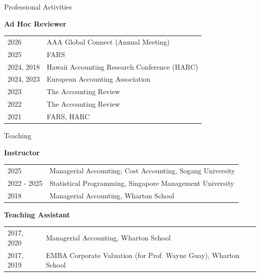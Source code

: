\documentclass{resume} %
\begin{document}
\begin{rSection}{Professional Activities}
\vspace{0.2cm}


{\bf Ad Hoc Reviewer} \medskip

\begin{tabular}{p{2cm}p{15.5cm}}
2026 & AAA Global Connect (Annual Meeting) \medskip \\
2025 & FARS \medskip \\
2024, 2018 &  Hawaii Accounting Research Conference (HARC) \medskip \\
2024, 2023 & European Accounting Association \medskip \\
2023 & The Accounting Review \medskip \\
2022 & The Accounting Review \medskip \\
2021 & FARS, HARC \medskip \\
\end{tabular}


\end{rSection}
\begin{rSection}{Teaching}

{\bf Instructor} \medskip

\begin{tabular}{p{2cm}p{15.5cm}}
2025 & Managerial Accounting; Cost Accounting, Sogang University  \medskip \\
2022 - 2025 & Statistical Programming, Singapore Management University \medskip \\
2018 & Managerial Accounting, Wharton School
\end{tabular}

{\bf Teaching Assistant} \medskip \\
\begin{tabular}{p{2cm}p{15.5cm}}
2017, 2020 & Managerial Accounting, Wharton School \medskip \\
2017, 2019 & EMBA Corporate Valuation (for Prof. Wayne Guay), Wharton School \medskip \\
\end{tabular}
\end{rSection}
\end{document}
